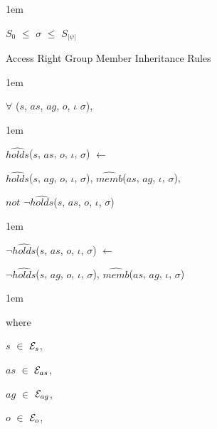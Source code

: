 \documentclass[11pt]{report}
\newenvironment{vquote}
{
  \begin{list}{}{\leftmargin 1em}\item[]
}
{
  \end{list}
}
\begin{document}
\begin{enumerate}
\begin{vquote}
                    \hspace{1em}
                    $S_{0}$ $\leq$ $\sigma$ $\leq$ $S_{|\psi|}$
                  \end{vquote}

                \item
                  Access Right Group Member Inheritance Rules

                  \begin{vquote}
                    $\forall$ ($s$, $as$, $ag$, $o$, $\iota$ $\sigma$),
                  \end{vquote}

                  \begin{vquote}
                    $\hat{holds}$($s$, $as$, $o$, $\iota$, $\sigma$)
                    $\leftarrow$

                    \hspace{1em}
                    $\hat{holds}$($s$, $ag$, $o$, $\iota$, $\sigma$),
                    $\hat{memb}$($as$, $ag$, $\iota$, $\sigma$),

                    \hspace{1em}
                    $not$ $\lnot\hat{holds}$($s$, $as$, $o$, $\iota$, $\sigma$)
                  \end{vquote}

                  \begin{vquote}
                    $\lnot\hat{holds}$($s$, $as$, $o$, $\iota$, $\sigma$)
                    $\leftarrow$

                    \hspace{1em}
                    $\lnot\hat{holds}$($s$, $ag$, $o$, $\iota$, $\sigma$),
                    $\hat{memb}$($as$, $ag$, $\iota$, $\sigma$)
                  \end{vquote}

                  \begin{vquote}
                    where

                    \hspace{1em}
                    $s$ $\in$ ${\cal E}_{s}$,

                    \hspace{1em}
                    $as$ $\in$ ${\cal E}_{as}$,

                    \hspace{1em}
                    $ag$ $\in$ ${\cal E}_{ag}$,

                    \hspace{1em}
                    $o$ $\in$ ${\cal E}_{o}$,


\end{vquote}
\end{enumerate}
\end{document}

